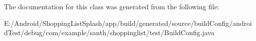 The documentation for this class was generated from the following file\+:\begin{DoxyCompactItemize}
\item 
E\+:/\+Android/\+Shopping\+List\+Splash/app/build/generated/source/build\+Config/android\+Test/debug/com/example/santh/shoppinglist/test/Build\+Config.\+java\end{DoxyCompactItemize}
